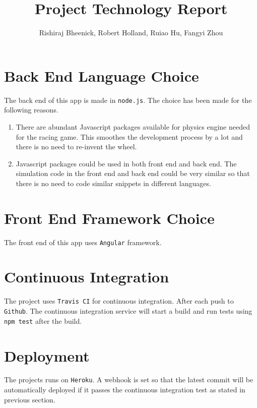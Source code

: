 \documentclass[a4paper]{article}
\title{Project Technology Report}
\author{Rishiraj Bheenick, Robert Holland, Ruiao Hu, Fangyi Zhou}
\begin{document}
\maketitle

\section{Back End Language Choice}

The back end of this app is made in \texttt{node.js}. The choice has been made
for the following reasons.
\begin{enumerate}
\item
There are abundant Javascript packages available for physics engine needed for
the racing game. This smoothes the development process by a lot and there is no
need to re-invent the wheel.
\item
Javascript packages could be used in both front end and back end. The
simulation code in the front end and back end could be very similar so that
there is no need to code similar snippets in different languages.
\end{enumerate}

\section{Front End Framework Choice}

The front end of this app uses \texttt{Angular} framework.

\section{Continuous Integration}

The project uses \texttt{Travis CI} for continuous integration. After each push
to \texttt{Github}. The continuous integration service will start a build and
run tests using \texttt{npm test} after the build.

\section{Deployment}

The projects runs on \texttt{Heroku}. A webhook is set so that the latest
commit will be automatically deployed if it passes the continuous integration
test as stated in previous section.
\end{document}
